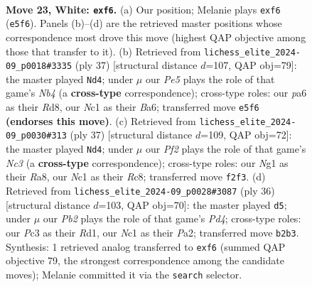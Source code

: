 \documentclass[11pt]{article}
\begin{document}
\begin{figure}[p]
\label{fig:thought-m42}
\end{figure}

\clearpage

\begin{figure}[p]\centering
\begin{subfigure}{0.46\textwidth}\centering
\resizebox{\linewidth}{!}{%
\newchessgame
\chessboard[
  setfen={r1b1rk2/4q2p/ppn1pnp1/2p1P3/P2p1Q2/2P5/1P3PPP/1KN1RBNR w - - 3 23},
  showmover=false,
  pgfstyle=straightmove, color=movearrow, markmove={e5-f6}
]}
\caption{}
\end{subfigure}\hfill
\begin{subfigure}{0.46\textwidth}\centering
\resizebox{\linewidth}{!}{%
\newchessgame
\chessboard[
  setfen={3r2k1/pr2pp1p/b1p3p1/qnp1B3/P3P1P1/1PN4P/2P2PK1/1R2Q2R b - - 0 19},
  showmover=false,
  pgfstyle=straightmove, color=movearrow, markmove={b5-d4}
]}
\caption{}
\end{subfigure}
\\[4pt]
\begin{subfigure}{0.46\textwidth}\centering
\resizebox{\linewidth}{!}{%
\newchessgame
\chessboard[
  setfen={r1r3k1/p3bppp/1pn1p3/2P5/P1P1qB2/3N2P1/R3PP1P/1Q3RK1 b - - 3 19},
  showmover=false,
  pgfstyle=straightmove, color=movearrow, markmove={c6-d4}
]}
\caption{}
\end{subfigure}\hfill
\begin{subfigure}{0.46\textwidth}\centering
\resizebox{\linewidth}{!}{%
\newchessgame
\chessboard[
  setfen={1br1r1k1/ppq2pp1/2p1np2/5Q2/2PP1N1p/4B2P/PP3PP1/3RR1K1 w - - 1 19},
  showmover=false,
  pgfstyle=straightmove, color=movearrow, markmove={d4-d5}
]}
\caption{}
\end{subfigure}
\caption{\textbf{Move 23, White: \texttt{exf6}.} (a) Our position; Melanie plays \texttt{exf6} (\texttt{e5f6}). Panels (b)--(d) are the retrieved master positions whose correspondence most drove this move (highest QAP objective among those that transfer to it). (b) Retrieved from \texttt{lichess\_elite\_2024-09\_p0018\#3335} (ply 37) [structural distance $d$=107, QAP obj=79]: the master played \texttt{Nd4}; under $\mu$ our \emph{Pe5} plays the role of that game's \emph{Nb4} (a \textbf{cross-type} correspondence); cross-type roles: our \emph{p}a6 as their \emph{R}d8, our \emph{N}c1 as their \emph{B}a6; transferred move \texttt{e5f6} \textbf{(endorses this move)}. (c) Retrieved from \texttt{lichess\_elite\_2024-09\_p0030\#313} (ply 37) [structural distance $d$=109, QAP obj=72]: the master played \texttt{Nd4}; under $\mu$ our \emph{Pf2} plays the role of that game's \emph{Nc3} (a \textbf{cross-type} correspondence); cross-type roles: our \emph{N}g1 as their \emph{R}a8, our \emph{N}c1 as their \emph{R}c8; transferred move \texttt{f2f3}. (d) Retrieved from \texttt{lichess\_elite\_2024-09\_p0028\#3087} (ply 36) [structural distance $d$=103, QAP obj=70]: the master played \texttt{d5}; under $\mu$ our \emph{Pb2} plays the role of that game's \emph{Pd4}; cross-type roles: our \emph{P}c3 as their \emph{R}d1, our \emph{N}c1 as their \emph{P}a2; transferred move \texttt{b2b3}. Synthesis: 1 retrieved analog transferred to \texttt{exf6} (summed QAP objective 79, the strongest correspondence among the candidate moves); Melanie committed it via the \texttt{search} selector.}

\end{figure}
\end{document}
